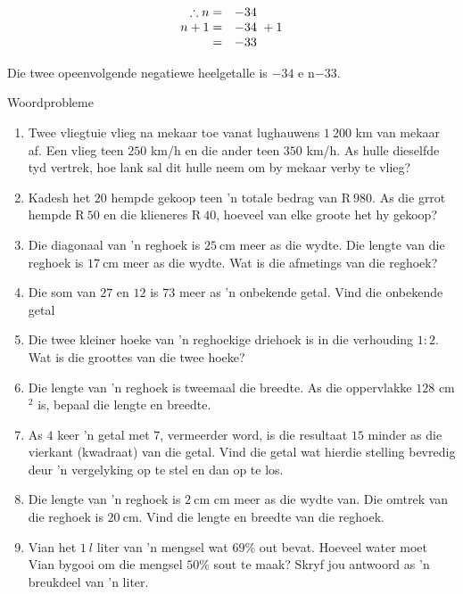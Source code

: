 \begin{aktiwiteit}{}
\begin{wex}
{
\begin{equation*}
    \begin{array}{cll}
	\hfill \therefore n =& -34\hfill \\
\hfill n + 1 =& -34\ + 1 \hfill \\
\hfill  =& -33\hfill \\

    \end{array}
\end{equation*}

Die twee opeenvolgende negatiewe heelgetalle is $-34$ e n$-33$.
}
\end{wex}

\begin{exercises}{Woordprobleme}
{
\begin{enumerate}[noitemsep, label=\textbf{\arabic*}. ] 
\item Twee vliegtuie vlieg na mekaar toe vanat lughauwens $1~200$ km van mekaar af. Een vlieg teen $250$ km/h en die ander teen $350$ km/h. As hulle dieselfde tyd vertrek, hoe lank sal dit hulle neem om by mekaar verby te vlieg?
\item Kadesh het $20$ hempde gekoop teen 'n totale bedrag van R$~980$. As die grrot hempde R$~50$ en die klieneres R$~40$, hoeveel van elke groote het hy gekoop?
\item Die diagonaal van ’n reghoek is $25~$cm meer as die wydte. Die lengte van die reghoek is $17~$cm meer as die wydte. Wat is die afmetings van die reghoek?  
\item Die som van $27$ en $12$ is $73$ meer as ’n onbekende getal. Vind die onbekende getal
\item Die twee kleiner hoeke van ’n reghoekige driehoek is in die verhouding $1:2$. Wat is die groottes van die
twee hoeke?
\item Die lengte van 'n reghoek is tweemaal die breedte. As die oppervlakke $128$ cm$^{2}$ is, bepaal die lengte en breedte.       
\item As $4$ keer ’n getal met $7$, vermeerder word, is die resultaat $15$ minder as die vierkant (kwadraat) van die
getal. Vind die getal wat hierdie stelling bevredig deur ’n vergelyking op te stel en dan op te los.
\item Die lengte van ’n reghoek is $2~$cm cm meer as die wydte van. Die omtrek van die reghoek is  $20~$cm. Vind die lengte en breedte van die reghoek.
\item Vian het $1~l$ liter van ’n mengsel wat $69\%$ out bevat. Hoeveel water moet Vian bygooi om die mengsel $50\%$ sout te maak? Skryf jou antwoord as ’n breukdeel van ’n liter.
       

\end{enumerate}}
\end{exercises}
\end{aktiwiteit}
